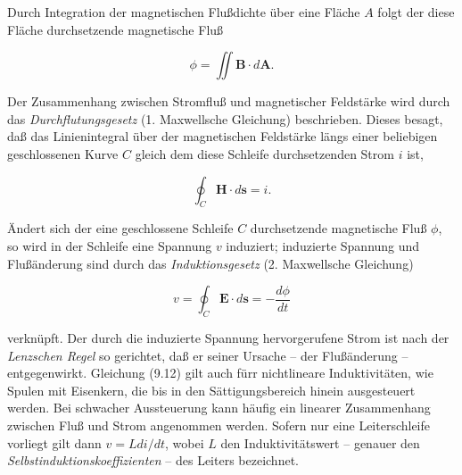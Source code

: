 \documentclass[
  ngerman,
  letterpaper,
]{scrbook}
\begin{document}
\begin{tcolorbox}[enhanced jigsaw, titlerule=0mm, rightrule=.15mm, toprule=.15mm, colback=white, toptitle=1mm, bottomrule=.15mm, coltitle=black, leftrule=.75mm, arc=.35mm, colbacktitle=quarto-callout-note-color!10!white, opacityback=0, bottomtitle=1mm, colframe=quarto-callout-note-color-frame, opacitybacktitle=0.6, breakable, title=\textcolor{quarto-callout-note-color}{\faInfo}\hspace{0.5em}{Durchflutungs- und Induktionsgesetz}, left=2mm]

Durch Integration der magnetischen Flußdichte über eine Fläche \(A\)
folgt der diese Fläche durchsetzende magnetische Fluß

\[
\phi = \iint \mathbf{B} \cdot d\mathbf{A}.
\]

Der Zusammenhang zwischen Stromfluß und magnetischer Feldstärke wird
durch das \emph{Durchflutungsgesetz} (1. Maxwellsche Gleichung)
beschrieben. Dieses besagt, daß das Linienintegral über der magnetischen
Feldstärke längs einer beliebigen geschlossenen Kurve \(C\) gleich dem
diese Schleife durchsetzenden Strom \(i\) ist,

\[
\oint_C \mathbf{H} \cdot d\mathbf{s} = i.
\]

Ändert sich der eine geschlossene Schleife \(C\) durchsetzende
magnetische Fluß \(\phi\), so wird in der Schleife eine Spannung \(v\)
induziert; induzierte Spannung und Flußänderung sind durch das
\emph{Induktionsgesetz} (2. Maxwellsche Gleichung)

\[
v = \oint_C \mathbf{E} \cdot d\mathbf{s} = -\frac{d\phi}{dt}
\]

verknüpft. Der durch die induzierte Spannung hervorgerufene Strom ist
nach der \emph{Lenzschen Regel} so gerichtet, daß er seiner Ursache --
der Flußänderung -- entgegenwirkt. Gleichung (9.12) gilt auch fürr
nichtlineare Induktivitäten, wie Spulen mit Eisenkern, die bis in den
Sättigungsbereich hinein ausgesteuert werden. Bei schwacher Aussteuerung
kann häufig ein linearer Zusammenhang zwischen Fluß und Strom angenommen
werden. Sofern nur eine Leiterschleife vorliegt gilt dann
\(v = L di/dt\), wobei \(L\) den Induktivitätswert -- genauer den
\emph{Selbstinduktionskoeffizienten} -- des Leiters bezeichnet.

\end{tcolorbox}
\end{document}
